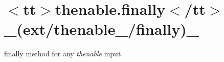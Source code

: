 \chapter{\texorpdfstring{$<$}{<}tt\texorpdfstring{$>$}{>}thenable.\+finally\texorpdfstring{$<$}{<}/tt\texorpdfstring{$>$}{>} \+\_\+(ext/thenable\+\_\+/finally)\+\_\+}
\hypertarget{md__2home_2solype_2delivery_2current__days_2Mannheim_2front_2node__modules_2ext_2docs_2thenable___2finally}{}\label{md__2home_2solype_2delivery_2current__days_2Mannheim_2front_2node__modules_2ext_2docs_2thenable___2finally}
\label{md__2home_2solype_2delivery_2current__days_2Mannheim_2front_2node__modules_2ext_2docs_2thenable___2finally_autotoc_md2584}%
%
 {\ttfamily finally} method for any {\itshape thenable} input


\begin{DoxyCode}{0}
\DoxyCodeLine{}

\end{DoxyCode}
 
